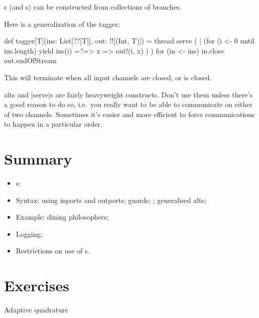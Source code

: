
\begin{slide}

s (and s) can be constructed from collections of
branches.

Here is a generalization of the tagger:
%
\begin{scala}
def tagger[T](ins: List[??[T]], out: !![(Int, T)]) = thread{
  serve ( 
    | (for (i <- 0 until ins.length) yield ins(i) =?=> { x => out!(i, x) })
  )
  for (in <- ins) in.close
  out.endOfStream
}
\end{scala}

This will terminate when all input channels are closed, or  is
closed. 
\end{slide}


\begin{slide}

alts and |serve|s are fairly heavyweight constructs.  Don't use them unless
there's a good reason to do so, i.e.~you really want to be able to communicate
on either of two channels.
Sometimes it's easier and more efficient to force communications to happen in
a particular order.
\end{slide}


\section{Summary}


\begin{itemize}
\item
{}s;

\item
Syntax: using inports and outports; guards; ; generalised alts;

\item
Example: dining philosophers;

\item
Logging;


\item
Restrictions on use of s. 
\end{itemize}



\section*{Exercises}


Adaptive quadrature 
